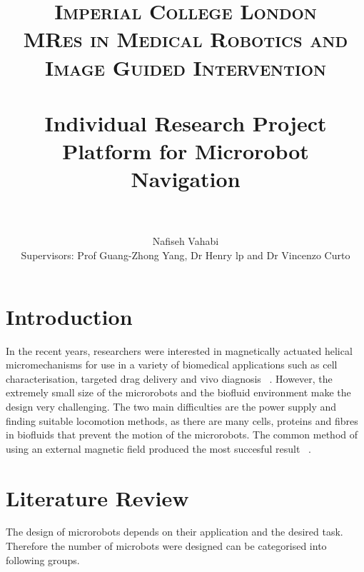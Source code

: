 \documentclass[a4paper,11pt]{article}
\title{
\normalfont \normalsize
\textsc{Imperial College London\\
MRes in Medical Robotics and Image Guided Intervention} \\ [1pt] %
\horrule{0.5pt} \\[0.4cm] %
\huge Individual Research Project \\
Platform for Microrobot Navigation \\ %
\horrule{2pt} \\[0.1cm] %
}
\author{
        Nafiseh Vahabi\\
	Supervisors: Prof Guang-Zhong Yang, Dr Henry lp and Dr Vincenzo Curto
}
\begin{document}



\begin{sloppypar}


\maketitle
\thispagestyle{plain}


\section{Introduction}

In the recent years, researchers were interested in magnetically actuated helical micromechanisms for use
 in a variety of biomedical applications such as cell characterisation, targeted drag delivery and vivo 
diagnosis ~\citep{peyer2013magnetic}. However, the extremely small size of the microrobots and the biofluid environment make the design 
very challenging. The two main difficulties are the power supply and finding suitable locomotion methods, as
 there are many cells, proteins and fibres in biofluids that prevent the motion of the microrobots. 
The common method of using an external magnetic field produced the most succesful result ~\citep{peyer2013bio}. 
\paragraph{}



\section{Literature Review}

The design of microrobots depends on their application and the desired task. Therefore the number of microbots
were designed can be categorised into following groups. 

\paragraph{}

\end{sloppypar}
\end{document}
